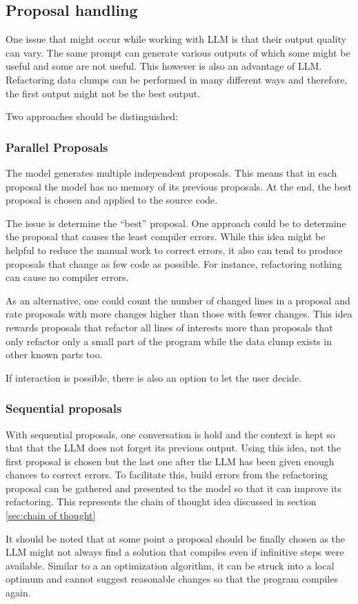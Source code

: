 \subsection{Proposal handling}

One issue that might occur while working with \ac{LLM} is that their output quality can vary. The same prompt can generate various outputs of which some might be useful and some are not useful. This however is also an advantage of \acs{LLM}. Refactoring data clumps can be performed in many different ways and therefore, the first output might not be the best output. 

Two approaches should be distinguished:
\subsubsection{Parallel Proposals}
The model generates multiple independent proposals. This means that in each proposal the model has no memory of its previous proposals. At the end, the best proposal is chosen and applied to the source code.

The issue is determine the \enquote{best} proposal. One approach could be to determine the proposal that causes the least compiler errors. While this idea might be helpful to reduce the manual work to correct errors, it also can tend to produce proposals that change as few code as possible. For instance, refactoring nothing can cause no compiler errors.

As an alternative, one could count the number of changed lines in a proposal and rate proposals with more changes higher than those with fewer changes. This idea rewards proposals that refactor all lines of interests more than proposals that only refactor only a small part of the program while the data clump exists in other known parts too. 


If interaction is possible, there is also an option to let the user decide.
\subsubsection{Sequential proposals}

With sequential proposals, one conversation is hold and the context is kept so that that the \ac{LLM} does not forget its previous output. Using this idea, not the first proposal is chosen but the last one after the \ac{LLM} has been given enough chances to correct errors.  To facilitate this, build errors from the refactoring proposal can be gathered and presented to the model so that it can improve its refactoring. This represents the chain of thought idea discussed in section \ref{sec:chain of thought}

It should be noted that at some point a proposal should be finally chosen as the \ac{LLM} might not always find a solution that compiles even if infinitive steps were available. Similar to a an optimization algorithm, it can be struck into a local optimum and cannot suggest reasonable changes so that the program compiles again.  